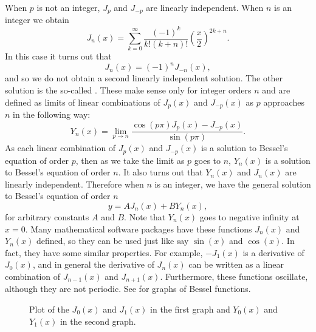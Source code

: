 \documentclass[12pt]{book}
\begin{document}
When $p$ is not an integer, $J_p$
and $J_{-p}$ are linearly independent.  When $n$ is an integer we 
obtain
\begin{equation*}
J_n(x) =
\sum_{k=0}^\infty
\frac{{(-1)}^k}{k! (k+n)!}
{\left(\frac{x}{2}\right)}^{2k+n} .
\end{equation*}
In this case it turns out that
\begin{equation*}
J_n(x) = {(-1)}^nJ_{-n}(x) ,
\end{equation*}
and so we do not obtain a second linearly independent
solution.  The other solution is the
so-called \emph{}.  These make
sense only for integer orders $n$ and
are defined as limits of linear combinations of $J_p(x)$ and $J_{-p}(x)$ as
$p$ approaches $n$ in the
following way:
\begin{equation*}
Y_n(x) = \lim_{p\to n} \frac{\cos(p \pi) J_p(x) - J_{-p}(x)}{\sin(p \pi)} .
\end{equation*}
As each linear combination of $J_p(x)$ and $J_{-p}(x)$ is a solution
to Bessel's equation of order $p$, then as we take the limit as $p$
goes to $n$, $Y_n(x)$ is a solution to Bessel's equation of
order $n$.  It also turns out that $Y_n(x)$ and $J_n(x)$ are linearly
independent.  Therefore when $n$ is an integer, we have the
general solution to Bessel's equation of order $n$
\begin{equation*}
y = A J_n(x) + B Y_n(x) ,
\end{equation*}
for arbitrary constants $A$ and $B$.  Note that
$Y_n(x)$ goes to negative infinity at $x=0$.   Many mathematical software
packages have
these functions $J_n(x)$ and $Y_n(x)$ defined, so they can be used
just like say $\sin(x)$ and $\cos(x)$.  In fact, they have some similar 
properties.  For example, $-J_1(x)$ is a derivative of $J_0(x)$, and
in general the derivative of $J_n(x)$ can be written as a linear
combination of $J_{n-1}(x)$ and $J_{n+1}(x)$.  Furthermore, these
functions oscillate, although they are not periodic.  See
 for graphs of Bessel functions.
\begin{figure}[h!t]
\capstart
\begin{center}
\noindent
%
\quad%
\caption{Plot of the $J_0(x)$ and $J_1(x)$ in the first graph
and $Y_0(x)$ and $Y_1(x)$ in the second graph.\label{bessel:graphsfig}}
\end{center}
\end{figure}
\end{document}
